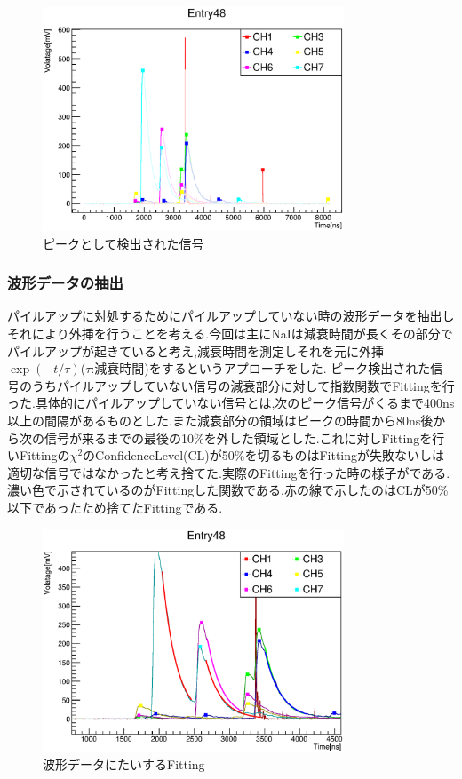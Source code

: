 \begin{figure}[bht]
  \centering
  \includegraphics[width=0.8\textwidth]{figure/hatano/peakdata.eps}
  \caption{ピークとして検出された信号}
  \label{hatano_fig:peakdata}
\end{figure}

\subsubsection{波形データの抽出}
パイルアップに対処するためにパイルアップしていない時の波形データを抽出しそれにより外挿を行うことを考える.今回は主にNaIは減衰時間が長くその部分でパイルアップが起きていると考え,減衰時間を測定しそれを元に外挿$\exp(-t/\tau)$($\tau$:減衰時間)をするというアプローチをした.
ピーク検出された信号のうちパイルアップしていない信号の減衰部分に対して指数関数でFittingを行った.具体的にパイルアップしていない信号とは,次のピーク信号がくるまで400ns以上の間隔があるものとした.また減衰部分の領域はピークの時間から80ns後から次の信号が来るまでの最後の10\%を外した領域とした.これに対しFittingを行いFittingの$\chi^2$のConfidenceLevel(CL)が50\%を切るものはFittingが失敗ないしは適切な信号ではなかったと考え捨てた.実際のFittingを行った時の様子がである.濃い色で示されているのがFittingした関数である.赤の線で示したのはCLが50\%以下であったため捨てたFittingである.

\begin{figure}[bht]
  \centering
  \includegraphics[width=0.8\textwidth]{figure/hatano/decayfit.eps}
  \caption{波形データにたいするFitting}
  \label{hatano_fig:decayfit}
\end{figure}

